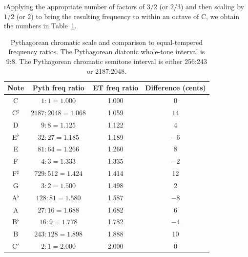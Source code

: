 \i Applying the appropriate number of factors of $3/2$ 
(or $2/3$) and then scaling by $1/2$ (or $2$) 
to bring the resulting frequency to within an octave
of C, we obtain the numbers
in Table~\ref{t:pythagorean-chromatic}.
%
%
%
\begin{table}[htbp]
\begin{center}
\begin{tabular}{|c|c|c|c|}
\hline
Note & Pyth freq ratio & ET freq ratio & Difference (cents) \\
\hline
C & $1:1=1.000$ & 1.000 & 0 \\
C$^\sharp$ & $2187:2048= 1.068$ & 1.059 & $14$ \\
D & $9:8=1.125$ & 1.122 & $4$ \\
E$^\flat$ & $32:27=1.185$ & 1.189 & $-6$ \\
E & $81:64=1.266$ & 1.260 & 8 \\
F & $4:3=1.333$ & 1.335 & $-2$ \\
F$^\sharp$ & $729:512=1.424$ & 1.414 & 12 \\
G & $3:2=1.500$ & 1.498 & 2 \\
A$^\flat$ & $128:81=1.580$ & 1.587 & $-8$ \\
A & $27:16=1.688$ & 1.682 & 6 \\
B$^\flat$ & $16:9=1.778$ & 1.782 & $-4$ \\
B & $243:128=1.898$ & 1.888 & 10 \\
C$'$ & $2:1=2.000$ & 2.000 & 0 \\
\hline
\end{tabular}
\caption{Pythagorean chromatic scale and comparison
to equal-tempered frequency ratios.
The Pythagorean diatonic whole-tone interval is 9:8.
The Pythagorean chromatic semitone interval is
either 256:243 or 2187:2048.}
\label{t:pythagorean-chromatic}
\end{center}
\end{table}

